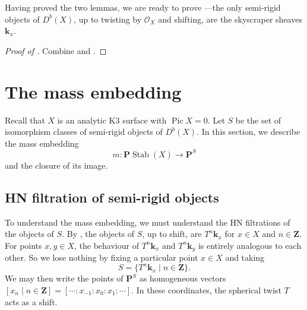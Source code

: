 \documentclass{amsart}
\begin{document}
Having proved the two lemmas, we are ready to prove ---the only semi-rigid objects of \(D^b(X)\), up to twisting by \(\mathcal{O}_X\) and shifting, are the skyscraper sheaves \(\mathbf{k}_x\).
\begin{proof}[Proof of ]
  Combine  and .
\end{proof}

\section{The mass embedding}\label{sec:mass}
Recall that \(X\) is an analytic K3 surface with \(\operatorname{Pic} X = 0\).
Let \(S\) be the set of isomorphism classes of semi-rigid objects of \(D^b(X)\).
In this section, we describe the mass embedding
\[ m \colon \mathbf{P} \operatorname{Stab}(X) \to \mathbf{P}^S\]
and the closure of its image.

\subsection{HN filtration of semi-rigid objects}
To understand the mass embedding, we must understand the HN filtrations of the objects of \(S\).
By , the objects of \(S\), up to shift, are \(T^n \mathbf{k}_x\) for \(x \in X\) and \(n \in \mathbf{Z}\).
For points \(x,y \in X\), the behaviour of \(T^n \mathbf{k}_x\) and \(T^n \mathbf{k}_y\) is entirely analogous to each other.
So we lose nothing by fixing a particular point \(x \in X\) and taking
\[ S = \{T^{n} \mathbf{k}_x \mid n \in \mathbf{Z}\}.\]
We may then write the points of \(\mathbf{P}^S\) as homogeneous vectors \([x_n \mid n \in \mathbf{Z}] = [\cdots : x_{-1} :x_0 :x_1 : \cdots]\).
In these coordinates, the spherical twist \(T\) acts as a shift.
\end{document}
